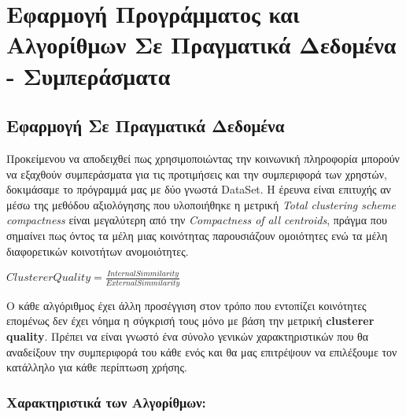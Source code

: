 \chapter{Εφαρμογή Προγράμματος και Αλγορίθμων Σε Πραγματικά Δεδομένα - Συμπεράσματα} %

\label{Εφαρμογή Σε Πραγματικά Δεδομένα - Συμπεράσματα} %


\section{Εφαρμογή Σε Πραγματικά Δεδομένα}

\noindent Προκείμενου να αποδειχθεί πως χρησιμοποιώντας την κοινωνική πληροφορία μπορούν
να εξαχθούν συμπεράσματα για τις προτιμήσεις και την συμπεριφορά των χρηστών, δοκιμάσαμε το πρόγραμμά μας 
με δύο γνωστά DataSet. Η έρευνα είναι επιτυχής αν μέσω της μεθόδου αξιολόγησης που υλοποιήθηκε 
η μετρική \emph{Total clustering scheme compactness} είναι μεγαλύτερη από την \emph{Compactness of all centroids},
πράγμα που σημαίνει πως όντος τα μέλη μιας κοινότητας παρουσιάζουν ομοιότητες ενώ τα μέλη διαφορετικών κοινοτήτων ανομοιότητες.

$ Clusterer  Quality = \frac{Internal Simmilarity}{External Simmilarity}  $

Ο κάθε αλγόριθμος έχει άλλη προσέγγιση στον τρόπο που εντοπίζει κοινότητες 
επομένως δεν έχει νόημα η σύγκρισή τους μόνο με βάση την μετρική
\textbf{clusterer quality}.
Πρέπει να 
είναι γνωστό ένα σύνολο γενικών χαρακτηριστικών που θα αναδείξουν την συμπεριφορά του
κάθε ενός
και θα μας επιτρέψουν να επιλέξουμε τον κατάλληλο για κάθε περίπτωση χρήσης.

\clearpage

\subsection{Χαρακτηριστικά των Αλγορίθμων:} 


